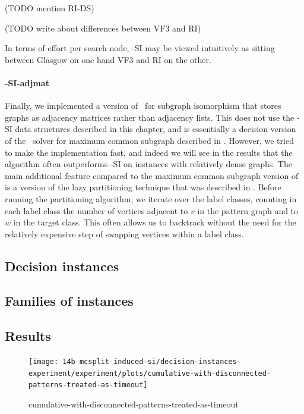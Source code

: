 (TODO mention RI-DS)

(TODO write about differences between VF3 and RI)

In terms of effort per search node, \McSplit-SI may be viewed intuitively as sitting
between Glasgow on one hand VF3 and RI on the other.

\paragraph*{\McSplit-SI-adjmat} Finally, we implemented a version of \McSplit\
for subgraph isomorphism that stores graphs as adjacency matrices rather than
adjacency lists.  This does not use the \McSplit-SI data structures described
in this chapter, and is essentially a decision version of the \McSplit\ solver
for maximum common subgraph described in \label{c:mcsplit-i-undirected}.
However, we tried to make the implementation fast, and indeed we will see in
the results that the algorithm often outperforms \McSplit-SI on instances with
relatively dense graphs.  The main additional feature compared to the maximum
common subgraph version of \McSplit is a version of the lazy partitioning
technique that was described in \Cref{subsec:lazy-partitioning}.  Before
running the partitioning algorithm, we iterate over the label classes, counting
in each label class the number of vertices adjacent to $v$ in the pattern graph
and to $w$ in the target class.  This often allows us to backtrack without the
need for the relatively expensive step of swapping vertices within a label
class.

\subsection{Decision instances}

\subsection{Families of instances}

\subsection{Results}

\begin{figure}[h!]
    \centering
    \texttt{[image: 14b-mcsplit-induced-si/decision-instances-experiment/experiment/plots/cumulative-with-disconnected-patterns-treated-as-timeout]}
    \caption{cumulative-with-disconnected-patterns-treated-as-timeout}
    \label{figure:cumulative-with-disconnected-patterns-treated-as-timeout}
\end{figure}

